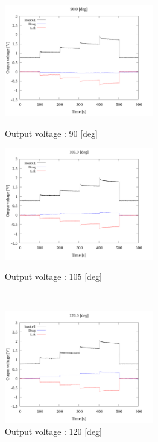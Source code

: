 \begin{figure}[htbp]
      \begin{minipage}[b]{0.45\linewidth}
        \centering
      \includegraphics[width=65mm]{../../02_workspace/result/2-1/plot/01-3_allsensors/01_allsensors_900.png}
      \caption{Output voltage : 90 [deg]}
    \end{minipage}
    \begin{minipage}[b]{0.45\linewidth}
        \centering
        \includegraphics[width=65mm]{../../02_workspace/result/2-1/plot/01-3_allsensors/01_allsensors_1050.png}
        \caption{Output voltage : 105 [deg]}
      \end{minipage}\\
      \begin{minipage}[b]{0.45\linewidth}
        \centering
        \includegraphics[width=65mm]{../../02_workspace/result/2-1/plot/01-3_allsensors/01_allsensors_1200.png}
        \caption{Output voltage : 120 [deg]}
      \end{minipage}
      \begin{minipage}[b]{0.45\linewidth}

\end{minipage}
\end{figure}
